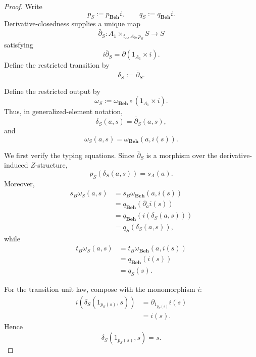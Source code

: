 \begin{proof}
    Write
    \[
        p_S:=p_{\mathbf{Beh}}i,
        \qquad
        q_S:=q_{\mathbf{Beh}}i.
    \]
    Derivative-closedness supplies a unique map
    \[
        \bar\partial_S:
        A_1\times_{t_A,A_0,p_S}S
        \to
        S
    \]
    satisfying
    \[
        i\bar\partial_S
        =
        \partial(1_{A_1}\times i).
    \]
    Define the restricted transition by
    \[
        \delta_S:=\bar\partial_S.
    \]

    Define the restricted output by
    \[
        \omega_S
        :=
        \omega_{\mathbf{Beh}}
        \circ
        (1_{A_1}\times i).
    \]
    Thus, in generalized-element notation,
    \[
        \delta_S(a,s)=\bar\partial_S(a,s),
    \]
    and
    \[
        \omega_S(a,s)
        =
        \omega_{\mathbf{Beh}}(a,i(s)).
    \]

    We first verify the typing equations. Since
    \(\bar\partial_S\) is a morphism over the derivative-induced
    \(Z\)-structure,
    \[
        p_S(\delta_S(a,s))=s_A(a).
    \]
    Moreover,
    \[
        \begin{aligned}
            s_B\omega_S(a,s)
            &=
            s_B\omega_{\mathbf{Beh}}(a,i(s))
            \\
            &=
            q_{\mathbf{Beh}}(\partial_a i(s))
            \\
            &=
            q_{\mathbf{Beh}}(i(\delta_S(a,s)))
            \\
            &=
            q_S(\delta_S(a,s)),
        \end{aligned}
    \]
    while
    \[
        \begin{aligned}
            t_B\omega_S(a,s)
            &=
            t_B\omega_{\mathbf{Beh}}(a,i(s))
            \\
            &=
            q_{\mathbf{Beh}}(i(s))
            \\
            &=
            q_S(s).
        \end{aligned}
    \]

    For the transition unit law, compose with the monomorphism \(i\):
    \[
        \begin{aligned}
            i(\delta_S(1_{p_S(s)},s))
            &=
            \partial_{1_{p_S(s)}}i(s)
            \\
            &=
            i(s).
        \end{aligned}
    \]
    Hence
    \[
        \delta_S(1_{p_S(s)},s)=s.
    \]


\end{proof}
